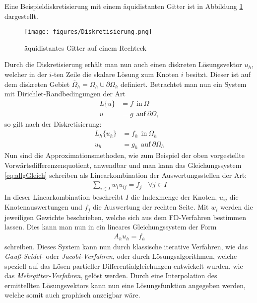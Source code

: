 \documentclass[a4paper,11pt]{article}
\begin{document}
Eine Beispieldiskretisierung mit einem äquidistanten Gitter ist in Abbildung \ref{fig:diskGit} dargestellt.
\begin{figure}[ht]
	\centering
	\texttt{[image: figures/Diskretisierung.png]}
	\caption[Diskretiesierung]{äquidistantes Gitter auf einem Rechteck}
	\label{fig:diskGit}
\end{figure}
Durch die Diskretisierung erhält man nun auch einen diskreten Lösungsvektor $u_h$, welcher in der $i$-ten Zeile die skalare Lösung zum Knoten $i$ besitzt. Dieser ist auf dem diskreten Gebiet $\overline{\Omega}_h=\Omega_h\cup\partial\Omega_h$ definiert. Betrachtet man nun ein System mit Dirichlet-Randbedingungen der Art
\begin{align}
 L\{u\}&=f~~\text{in}~\Omega\nonumber\\
 u&=g~~\text{auf}~\partial\Omega\nonumber,
\end{align}
so gilt nach der Diskretisierung:
\begin{align}
 L_h\{u_h\}&=f_h~~\text{in}~\Omega_h\nonumber\\
 u_h&=g_h~~\text{auf}~\partial\Omega_h\label{eq:allgGleich}
\end{align}
Nun sind die Approximationsmethoden, wie zum Beispiel der oben vorgestellte Vorwärtsdifferenzenquotient, anwendbar und man kann das Gleichungssystem \eqref{eq:allgGleich} schreiben als Linearkombination der Auswertungsstellen der Art:
\begin{align}
 \sum_{i\in I}w_iu_{ij}=f_j~~~~\forall j\in I
\end{align}
In dieser Linearkombination beschreibt $I$ die Indexmenge der Knoten, $u_{ij}$ die Knotenauswertungen und $f_j$ die Auswertung der rechten Seite. Mit $w_i$ werden die jeweiligen Gewichte beschrieben, welche sich aus dem FD-Verfahren bestimmen lassen. Dies kann man nun in ein lineares Gleichungssystem der Form
\begin{align}
 A_hu_h=f_h
\end{align}
schreiben. Dieses System kann nun durch klassische iterative Verfahren, wie das \textit{Gauß-Seidel-} oder \textit{Jacobi-Verfahren}, oder durch Lösungsalgorithmen, welche speziell auf das Lösen partieller Differentialgleichungen entwickelt wurden, wie das \textit{Mehrgitter-Verfahren}, gelöst werden. Durch eine Interpolation des ermittellten Lösungsvektors kann nun eine Lösungsfunktion angegeben werden, welche somit auch graphisch anzeigbar wäre.
\end{document}
